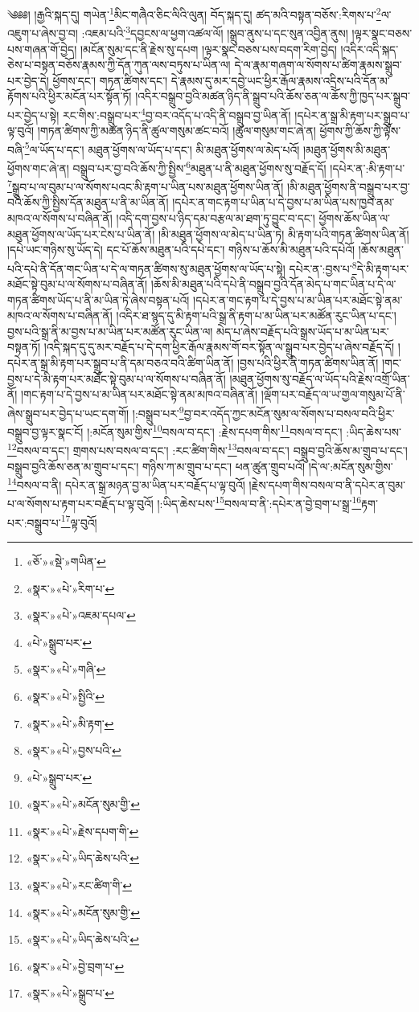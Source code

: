 ༄༅༅། །རྒྱའི་སྐད་དུ། གཡེན་\footnote{«ཅོ་»«སྡེ་»གཡིན་}མིང་གཞཻའ་ཅིང་ལིའི་ལུན། བོད་སྐད་དུ། ཚད་མའི་བསྟན་བཅོས་:རིགས་པ་\footnote{«སྣར་»«པེ་»རིག་པ་}ལ་འཇུག་པ་ཞེས་བྱ་བ། :འཇམ་པའི་\footnote{«སྣར་»«པེ་»འཇམ་དཔལ་}དབྱངས་ལ་ཕྱག་འཚལ་ལོ། །སྒྲུབ་ནུས་པ་དང་སུན་འབྱིན་ནུས། །ལྟར་སྣང་བཅས་པས་གཞན་གོ་བྱེད། །མངོན་སུམ་དང་ནི་རྗེས་སུ་དཔག །ལྟར་སྣང་བཅས་པས་བདག་རིག་བྱེད། །འདིར་འདི་སྐད་ཅེས་པ་བསྟན་བཅོས་རྣམས་ཀྱི་དོན་ཀུན་ལས་བཏུས་པ་ཡིན་ལ། དེ་ལ་རྣམ་གཞག་ལ་སོགས་པ་ཚིག་རྣམས་སྒྲུབ་པར་བྱེད་དེ། ཕྱོགས་དང་། གཏན་ཚིགས་དང་། དེ་རྣམས་དུ་མར་དབྱེ་ཡང་ཕྱིར་རྒོལ་རྣམས་འདྲིས་པའི་དོན་མ་རྟོགས་པའི་ཕྱིར་མངོན་པར་སྟོན་ཏོ། །འདིར་བསྒྲུབ་བྱའི་མཚན་ཉིད་ནི་སྒྲུབ་པའི་ཆོས་ཅན་ལ་ཆོས་ཀྱི་ཁྱད་པར་སྒྲུབ་པར་བྱེད་པ་སྟེ། རང་གིས་:བསྒྲུབ་པར་\footnote{«པེ་»སྒྲུབ་པར་}བྱ་བར་འདོད་པ་འདི་ནི་བསྒྲུབ་བྱ་ཡིན་ནོ། །དཔེར་ན་སྒྲ་མི་རྟག་པར་སྒྲུབ་པ་ལྟ་བུའོ། །གཏན་ཚིགས་ཀྱི་མཚན་ཉིད་ནི་ཚུལ་གསུམ་ཚང་བའོ། །ཚུལ་གསུམ་གང་ཞེ་ན། ཕྱོགས་ཀྱི་ཆོས་ཀྱི་ལྟོས་བཞི་\footnote{«སྣར་»«པེ་»གཞི་}ལ་ཡོད་པ་དང་། མཐུན་ཕྱོགས་ལ་ཡོད་པ་དང་། མི་མཐུན་ཕྱོགས་ལ་མེད་པའོ། །མཐུན་ཕྱོགས་མི་མཐུན་ཕྱོགས་གང་ཞེ་ན། བསྒྲུབ་པར་བྱ་བའི་ཆོས་ཀྱི་སྤྱིས་\footnote{«སྣར་»«པེ་»སྤྱིའི་}མཐུན་པ་ནི་མཐུན་ཕྱོགས་སུ་བརྗོད་དོ། །དཔེར་ན་:མི་རྟག་པ་\footnote{«སྣར་»«པེ་»མི་རྟག་}སྒྲུབ་པ་ལ་བུམ་པ་ལ་སོགས་པའང་མི་རྟག་པ་ཡིན་པས་མཐུན་ཕྱོགས་ཡིན་ནོ། །མི་མཐུན་ཕྱོགས་ནི་བསྒྲུབ་པར་བྱ་བའི་ཆོས་ཀྱི་སྤྱིས་དོན་མཐུན་པ་ནི་མ་ཡིན་ནོ། །དཔེར་ན་གང་རྟག་པ་ཡིན་པ་དེ་བྱས་པ་མ་ཡིན་པས་ཁྱབ་ནམ་མཁའ་ལ་སོགས་པ་བཞིན་ནོ། །འདི་དག་བྱས་པ་ཉིད་དམ་བརྩལ་མ་ཐག་ཏུ་བྱུང་བ་དང་། ཕྱོགས་ཆོས་ཡིན་ལ་མཐུན་ཕྱོགས་ལ་ཡོད་པར་ངེས་པ་ཡིན་ནོ། །མི་མཐུན་ཕྱོགས་ལ་མེད་པ་ཡིན་ཏེ། མི་རྟག་པའི་གཏན་ཚིགས་ཡིན་ནོ། །དཔེ་ཡང་གཉིས་སུ་ཡོད་དེ། དང་པོ་ཆོས་མཐུན་པའི་དཔེ་དང་། གཉིས་པ་ཆོས་མི་མཐུན་པའི་དཔེའོ། །ཆོས་མཐུན་པའི་དཔེ་ནི་དོན་གང་ཡིན་པ་དེ་ལ་གཏན་ཚིགས་སུ་མཐུན་ཕྱོགས་ལ་ཡོད་པ་སྟེ། དཔེར་ན་:བྱས་པ་\footnote{«སྣར་»«པེ་»བྱས་པའི་}དེ་མི་རྟག་པར་མཐོང་སྟེ་བུམ་པ་ལ་སོགས་པ་བཞིན་ནོ། །ཆོས་མི་མཐུན་པའི་དཔེ་ནི་བསྒྲུབ་བྱའི་དོན་མེད་པ་གང་ཡིན་པ་དེ་ལ་གཏན་ཚིགས་ཡོད་པ་ནི་མ་ཡིན་ཏེ་ཞེས་བསྟན་པའོ། །དཔེར་ན་གང་རྟག་པ་དེ་བྱས་པ་མ་ཡིན་པར་མཐོང་སྟེ་ནམ་མཁའ་ལ་སོགས་པ་བཞིན་ནོ། །འདིར་ཐ་སྙད་དུ་མི་རྟག་པའི་སྒྲ་ནི་རྟག་པ་མ་ཡིན་པར་མཚོན་རུང་ཡིན་པ་དང་། བྱས་པའི་སྒྲ་ནི་མ་བྱས་པ་མ་ཡིན་པར་མཚོན་རུང་ཡིན་ལ། མེད་པ་ཞེས་བརྗོད་པའི་སྒྲས་ཡོད་པ་མ་ཡིན་པར་བསྟན་ཏོ། །འདི་སྐད་དུ་དུ་མར་བརྗོད་པ་དེ་དག་ཕྱིར་རྒོལ་རྣམས་གོ་བར་སྟོན་ལ་སྒྲུབ་པར་བྱེད་པ་ཞེས་བརྗོད་དོ། །དཔེར་ན་སྒྲ་མི་རྟག་པར་སྒྲུབ་པ་ནི་དམ་བཅའ་བའི་ཚིག་ཡིན་ནོ། །བྱས་པའི་ཕྱིར་ནི་གཏན་ཚིགས་ཡིན་ནོ། །གང་བྱས་པ་དེ་མི་རྟག་པར་མཐོང་སྟེ་བུམ་པ་ལ་སོགས་པ་བཞིན་ནོ། །མཐུན་ཕྱོགས་སུ་བརྗོད་ལ་ཡོད་པའི་རྗེས་འགྲོ་ཡིན་ནོ། །གང་རྟག་པ་དེ་བྱས་པ་མ་ཡིན་པར་མཐོང་སྟེ་ནམ་མཁའ་བཞིན་ནོ། །ལྡོག་པར་བརྗོད་ལ་ཡ་གྱལ་གསུམ་པོ་ནི་ཞེས་སྒྲུབ་པར་བྱེད་པ་ཡང་དག་གོ། །:བསྒྲུབ་པར་\footnote{«པེ་»སྒྲུབ་པར་}བྱ་བར་འདོད་ཀྱང་མངོན་སུམ་ལ་སོགས་པ་བསལ་བའི་ཕྱིར་བསྒྲུབ་བྱ་ལྟར་སྣང་ངོ། །:མངོན་སུམ་གྱིས་\footnote{«སྣར་»«པེ་»མངོན་སུམ་གྱི་}བསལ་བ་དང་། :རྗེས་དཔག་གིས་\footnote{«སྣར་»«པེ་»རྗེས་དཔག་གི་}བསལ་བ་དང་། :ཡིད་ཆེས་པས་\footnote{«སྣར་»«པེ་»ཡིད་ཆེས་པའི་}བསལ་བ་དང་། གྲགས་པས་བསལ་བ་དང་། :རང་ཚིག་གིས་\footnote{«སྣར་»«པེ་»རང་ཚིག་གི་}བསལ་བ་དང་། བསྒྲུབ་བྱའི་ཆོས་མ་གྲུབ་པ་དང་། བསྒྲུབ་བྱའི་ཆོས་ཅན་མ་གྲུབ་པ་དང་། གཉིས་ཀ་མ་གྲུབ་པ་དང་། ཕན་ཚུན་གྲུབ་པའོ། །དེ་ལ་:མངོན་སུམ་གྱིས་\footnote{«སྣར་»«པེ་»མངོན་སུམ་གྱི་}བསལ་བ་ནི། དཔེར་ན་སྒྲ་མཉན་བྱ་མ་ཡིན་པར་བརྗོད་པ་ལྟ་བུའོ། །རྗེས་དཔག་གིས་བསལ་བ་ནི་དཔེར་ན་བུམ་པ་ལ་སོགས་པ་རྟག་པར་བརྗོད་པ་ལྟ་བུའོ། །:ཡིད་ཆེས་པས་\footnote{«སྣར་»«པེ་»ཡིད་ཆེས་པའི་}བསལ་བ་ནི་:དཔེར་ན་བྱེ་བྲག་པ་སྒྲ་\footnote{«སྣར་»«པེ་»བྱེ་བྲག་པ་}རྟག་པར་:བསྒྲུབ་པ་\footnote{«སྣར་»«པེ་»སྒྲུབ་པ་}ལྟ་བུའོ། 